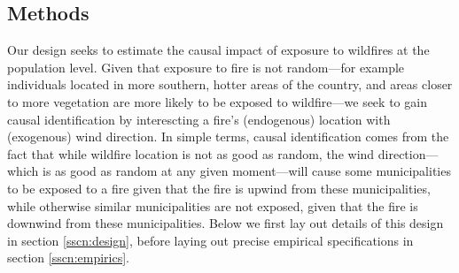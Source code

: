 \documentclass[11pt]{article}
\begin{document}
\begin{spacing}{1.5}



\section{Methods}
\label{scn:methods}
Our design seeks to estimate the causal impact of exposure to wildfires at the population level.  Given that exposure to fire is not random---for example individuals located in more southern, hotter areas of the country, and areas closer to more vegetation are more likely to be exposed to wildfire---we seek to gain causal identification by interescting a fire's (endogenous) location with (exogenous) wind direction.  In simple terms, causal identification comes from the fact that while wildfire location is not as good as random, the wind direction---which is as good as random at any given moment---will cause some municipalities to be exposed to a fire given that the fire is upwind from these municipalities, while otherwise similar municipalities are not exposed, given that the fire is downwind from these municipalities.  Below we first lay out details of this design in section \ref{sscn:design}, before laying out precise empirical specifications in section \ref{sscn:empirics}.


\end{spacing}
\end{document}
